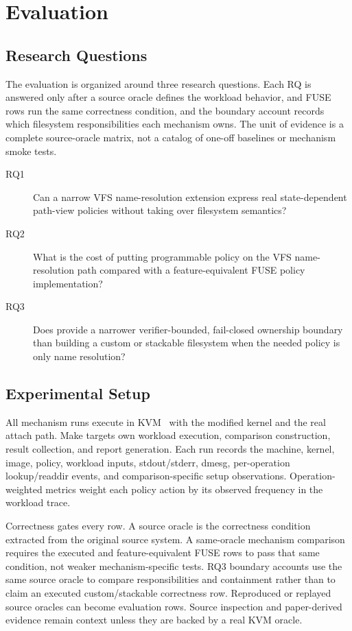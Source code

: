 \section{Evaluation}
\label{sec:evaluation}

\subsection{Research Questions}

The evaluation is organized around three research questions. Each RQ is answered
only after a source oracle defines the workload behavior, \namei and FUSE rows
run the same correctness condition, and the boundary account records which
filesystem responsibilities each mechanism owns.
The unit of evidence is a complete source-oracle matrix, not a catalog of
one-off baselines or mechanism smoke tests.

\begin{description}
\item[RQ1] Can a narrow VFS name-resolution extension express real
state-dependent path-view policies without taking over filesystem semantics?
\item[RQ2] What is the cost of putting programmable policy on the VFS
name-resolution path compared with a feature-equivalent FUSE policy
implementation?
\item[RQ3] Does \namei provide a narrower verifier-bounded, fail-closed
ownership boundary than building a custom or stackable filesystem when the
needed policy is only name resolution?
\end{description}

\subsection{Experimental Setup}

All \namei mechanism runs execute in KVM~\cite{linux_kvm} with the modified
kernel and the real  attach path. Make targets own
workload execution, comparison construction, result collection, and report
generation. Each run records the machine, kernel, image, policy, workload
inputs, stdout/stderr, dmesg, per-operation lookup/readdir events, and
comparison-specific setup observations.
Operation-weighted metrics weight each policy action by its observed frequency
in the workload trace.

Correctness gates every row. A source oracle is the correctness condition
extracted from the original source system. A same-oracle mechanism comparison
requires the executed \namei and feature-equivalent FUSE rows to pass that same
condition, not weaker mechanism-specific tests. RQ3 boundary accounts use the
same source oracle to compare responsibilities and containment rather than to
claim an executed custom/stackable correctness row. Reproduced or replayed
source oracles can become evaluation rows. Source inspection and paper-derived
evidence remain context unless they are backed by a real KVM oracle.

